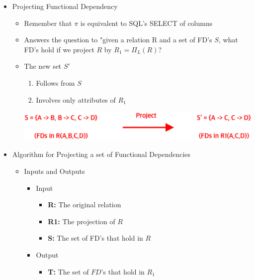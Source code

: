 \documentclass[12pt]{article}
\begin{document}
\begin{enumerate}[1.]
\begin{enumerate}[a)]
        \begin{itemize}
            \item Projecting Functional Dependency
            \begin{itemize}
                \item Remember that $\pi$ is equivalent to SQL's SELECT of columns
                \item Answers the question to "given a relation R and a set of FD's $S$,
                what FD's hold if we project $R$ by $R_1 = \Pi_L(R)$?
                \item The new set $S'$
                \begin{enumerate}[1.]
                    \item Follows from $S$
                    \item Involves only attributes of $R_1$
                \end{enumerate}

                \bigskip

                \begin{center}
                \includegraphics[width=0.7\linewidth]{images/worksheet_12_solution_2.png}
                \end{center}
            \end{itemize}

            \item Algorithm for Projecting a set of Functional Dependencies
            \begin{itemize}
                \item Inputs and Outputs
                \begin{itemize}
                    \item Input
                    \begin{itemize}
                        \item \textbf{R:} The original relation
                        \item \textbf{R1:} The projection of $R$
                        \item \textbf{S:} The set of FD's that hold in $R$
                    \end{itemize}
                    \item Output
                    \begin{itemize}
                        \item \textbf{T:} The set of $FD$'s that hold in $R_1$
                    \end{itemize}
                \end{itemize}


\end{itemize}
\end{itemize}
\end{enumerate}
\end{enumerate}
\end{document}
